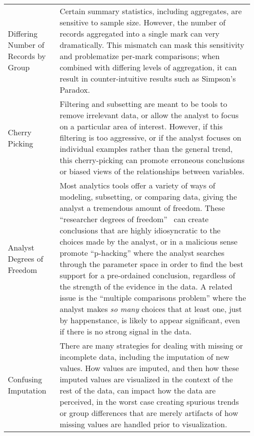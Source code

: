 \begin{table*}[ht!]
\begin{tabular}{p{2.2cm}p{14.8cm}}
   \rowcolor{colorb}\multirow{4}{0em}{\hspace{-0.6cm}\rotatebox{90}{\normalsize{Wrangling}}}Differing Number \newline of Records by \newline Group  & Certain summary statistics, including aggregates, are sensitive to sample size. However, the number of records aggregated into a single mark can very dramatically. This mismatch can mask this sensitivity and problematize per-mark comparisons; when combined with differing levels of aggregation, it can result in counter-intuitive results such as Simpson's Paradox. \cite{guo2017you}\\
 \rowcolor{colorb-opaque}Cherry Picking & Filtering and subsetting are meant to be tools to remove irrelevant data, or allow the analyst to focus on a particular area of interest. However, if this filtering is too aggressive, or if the analyst focuses on individual examples rather than the general trend, this cherry-picking can promote erroneous conclusions or biased views of the relationships between variables. \cite{few2019loom}\\
 \rowcolor{colorb}Analyst Degrees of Freedom & Most analytics tools offer a variety of ways of modeling, subsetting, or comparing data, giving the analyst a tremendous amount of freedom. These ``researcher degrees of freedom''~\cite{gelman2013garden} can create conclusions that are highly idiosyncratic to the choices made by the analyst, or in a malicious sense promote ``p-hacking'' where the analyst searches through the parameter space in order to find the best support for a pre-ordained conclusion, regardless of the strength of the evidence in the data. A related issue is the ``multiple comparisons problem'' where the analyst makes \emph{so many} choices that at least one, just by happenstance, is likely to appear significant, even if there is no strong signal in the data. \cite{gelman2013garden,pu2018garden,zgraggen2018investigating}\\
 \rowcolor{colorb-opaque}Confusing Imputation  & There are many strategies for dealing with missing or incomplete data, including the imputation of new values. How values are imputed, and then how these imputed values are visualized in the context of the rest of the data, can impact how the data are perceived, in the worst case creating spurious trends or group differences that are merely artifacts of how missing values are handled prior to visualization. \cite{song2018s}\\


\end{tabular}
\end{table*}
